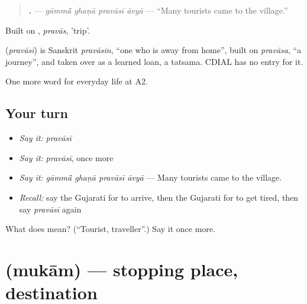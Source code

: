 \begin{quote}
\textbf{   .} — \emph{gāmmā̃ ghaṇā pravāsī āvyā} — \textquotedblleft{}Many tourists came to the village.\textquotedblright{}
\end{quote}

Built on \textbf{}, \emph{pravās}, 'trip'.

\begin{cousinweb}
\textbf{} (\emph{pravāsī}) is Sanskrit \emph{pravāsin}, \textquotedblleft{}one who is away from home\textquotedblright{}, built on \emph{pravāsa}, \textquotedblleft{}a journey\textquotedblright{}, and taken over as a learned loan, a tatsama. CDIAL has no entry for it.
\end{cousinweb}

\begin{grammarlens}[title={What you've built}]
One more word for everyday life at A2.
\end{grammarlens}

\subsection*{Your turn}
\begin{itemize}
\raggedright
  \item \emph{Say it:} \emph{pravāsī}
  \item \emph{Say it:} \emph{pravāsī}, once more
  \item \emph{Say it:} \emph{gāmmā̃ ghaṇā pravāsī āvyā} — Many tourists came to the village.
  \item \emph{Recall:} say the Gujarati for to arrive, then the Gujarati for to get tired, then say \emph{pravāsī} again
\end{itemize}

\begin{tcolorbox}[breakable,colback=teal!4,colframe=teal!35!black,title={Before you move on}]
What does  mean? (\textquotedblleft{}Tourist, traveller\textquotedblright{}.) Say it once more.
\end{tcolorbox}
\section[\texorpdfstring{\gu{મુકામ} (mukām)}{મુકામ (mukām)}]{ (mukām) — stopping place, destination}

\label{lesson:GU-C206-mukam}



